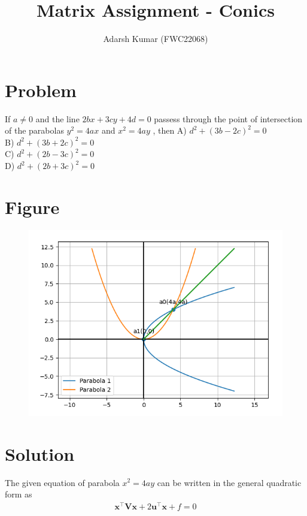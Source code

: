 \documentclass[journal,12pt,twocolumn]{IEEEtran}
\title{\mytitle}
\title{
Matrix Assignment - Conics
}
\author{Adarsh Kumar (FWC22068)}
\let\vec\mathbf
\let\vec\mathbf
\begin{document}
\maketitle
\tableofcontents
\bigskip


\section{\textbf{Problem}}
If $a \neq 0$ and the line $ 2bx+3cy+4d = 0$ passess through the point of intersection of the parabolas $ y^2 =4ax$ and $ x^2=4ay$ , then
\linebreak
A) $d^2 + (3b-2c)^2 =0 $ \\ B) $d^2 + (3b+2c)^2 =0 $\\ C) $d^2 + (2b-3c)^2 =0 $ \\D) $d^2 + (2b+3c)^2 =0 $
\\
\section{\textbf{Figure}}
\begin{figure}[h]
    \centering
\includegraphics[width=\columnwidth]{con.png}
    \label{fig:my_label}
\end{figure}
\section{\textbf{Solution}}
The given equation of parabola $x^2 = 4ay$ can be written in the general quadratic form as
\begin{align}
    \label{eq:conic_quad_form}
    \vec{x}^{\top}\vec{V}\vec{x}+2\vec{u}^{\top}\vec{x}+f=0
    \end{align}
 
\end{document}
